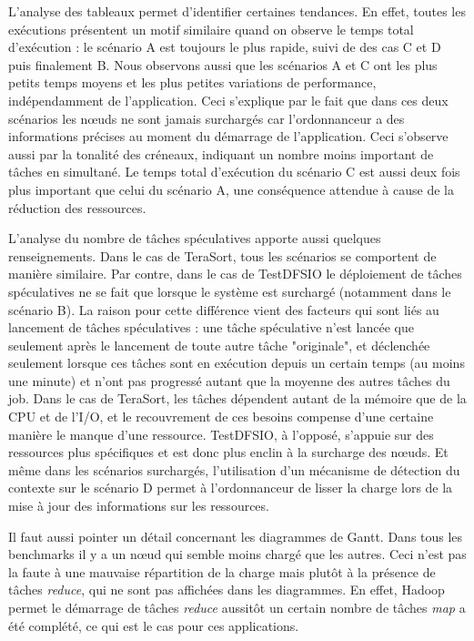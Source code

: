 L'analyse des tableaux permet d'identifier certaines tendances. En effet, toutes les exécutions présentent un motif similaire quand on observe le temps total d'exécution : le scénario A est toujours le plus rapide, suivi de des cas C et D puis finalement  B. Nous observons aussi que les scénarios A et C ont les plus petits temps moyens et les plus petites variations de performance, indépendamment de l'application. Ceci s'explique par le fait que dans ces deux scénarios les n{\oe}uds ne sont jamais surchargés car l'ordonnanceur a des informations précises au moment du démarrage de l'application. Ceci s'observe aussi par la tonalité des créneaux, indiquant un nombre moins important de tâches en simultané. Le temps total d'exécution du scénario C est aussi deux fois plus important que celui du scénario A, une conséquence attendue à cause de la réduction des ressources. 

L'analyse du nombre de tâches spéculatives apporte aussi quelques renseignements. Dans le cas de TeraSort, tous les scénarios se comportent de manière similaire. Par contre, dans le cas de TestDFSIO le déploiement de tâches spéculatives ne se fait que lorsque le système est surchargé (notamment dans le scénario B). La raison pour cette différence vient des facteurs qui sont liés au lancement de tâches spéculatives : une tâche spéculative n'est lancée que seulement après le lancement de toute autre tâche "originale", et déclenchée seulement lorsque ces tâches sont en exécution depuis un certain temps (au moins une minute) et n'ont pas progressé autant que la moyenne des autres tâches du job. Dans le cas de TeraSort, les tâches dépendent autant de la mémoire que de la CPU et de l'I/O, et le recouvrement de ces besoins compense d'une certaine manière le manque d'une ressource. TestDFSIO, à l'opposé, s'appuie sur des ressources plus spécifiques et est donc plus enclin à la surcharge des n{\oe}uds. Et même dans les scénarios surchargés, l'utilisation d'un mécanisme de détection du contexte sur le scénario D permet à l'ordonnanceur de lisser la charge lors de la mise à jour des informations sur les ressources.

Il faut aussi pointer un détail concernant les diagrammes de Gantt. Dans tous les benchmarks il y a un n{\oe}ud qui semble moins chargé que les autres. Ceci n'est pas la faute à une mauvaise répartition de la charge mais plutôt à la présence de tâches \textit{reduce}, qui ne sont pas affichées dans les diagrammes. En effet, Hadoop permet le démarrage de tâches \textit{reduce} aussitôt un certain nombre de tâches \textit{map} a été complété, ce qui est le cas pour ces applications.

